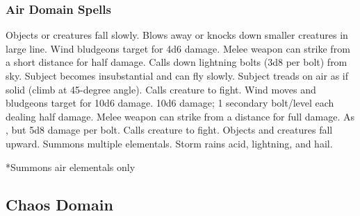 \subsubsection{Air Domain Spells}
\begin{spelllist}
 Objects or creatures fall slowly.
 Blows away or knocks down smaller creatures in large line.
 Wind bludgeons target for 4d6 damage.
 Melee weapon can strike from a short distance for half damage.
 Calls down lightning bolts (3d8 per bolt) from sky.
 Subject becomes insubstantial and can fly slowly.
 Subject treads on air as if solid (climb at 45-degree angle).
 Calls creature to fight.
\spellhead[5]{}
 Wind moves and bludgeons target for 10d6 damage.
 10d6 damage; 1 secondary bolt/level each dealing half damage.
 Melee weapon can strike from a distance for full damage.
 As , but 5d8 damage per bolt.
 Calls creature to fight.
 Objects and creatures fall upward.
 Summons multiple elementals.
 Storm rains acid, lightning, and hail.
\end{spelllist}
*Summons air elementals only

\subsection{Chaos Domain}

